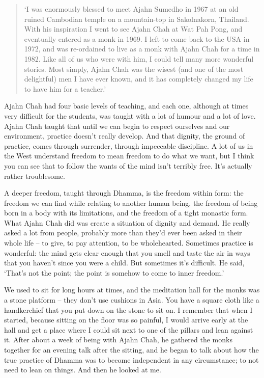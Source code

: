 
\begin{quote}
`I was enormously blessed to meet Ajahn Sumedho in 1967 at
an old ruined Cambodian temple on a mountain-top in Sakolnakorn, 
Thailand. With his inspiration I went to see Ajahn Chah at Wat Pah Pong, 
and eventually entered as a monk in 1969. I left to come back to the USA
in 1972, and was re-ordained to live as a monk with Ajahn Chah for a
time in 1982. Like all of us who were with him, I could tell many more
wonderful stories. Most simply, Ajahn Chah was the wisest (and one of
the most delightful) men I have ever known, and it has completely
changed my life to have him for a teacher.'
\end{quote}

\noindent
Ajahn Chah had four basic levels of teaching, and each one, although at
times very difficult for the students, was taught with a lot of humour
and a lot of love. Ajahn Chah taught that until we can begin to respect
ourselves and our environment, practice doesn't really develop. And that
dignity, the ground of practice, comes through surrender, through
impeccable discipline. A lot of us in the West understand freedom to
mean freedom to do what we want, but I think you can see that to follow
the wants of the mind isn't terribly free. It's actually rather
troublesome. 

A deeper freedom, taught through Dhamma, is the freedom within form: the
freedom we can find while relating to another human being, the freedom
of being born in a body with its limitations, and the freedom of a tight
monastic form. What Ajahn Chah did was create a situation of dignity and
demand. He really asked a lot from people, probably more than they'd
ever been asked in their whole life -- to give, to pay attention, to be
wholehearted. Sometimes practice is wonderful: the mind gets clear
enough that you smell and taste the air in ways that you haven't since
you were a child. But sometimes it's difficult. He said, `That's not the
point; the point is somehow to come to inner freedom.'

We used to sit for long hours at times, and the meditation hall for the
monks was a stone platform -- they don't use cushions in Asia. You have a
square cloth like a handkerchief that you put down on the stone to sit
on. I remember that when I started, because sitting on the floor was so
painful, I would arrive early at the hall and get a place where I could
sit next to one of the pillars and lean against it. After about a week
of being with Ajahn Chah, he gathered the monks together for an evening
talk after the sitting, and he began to talk about how the true practice
of Dhamma was to become independent in any circumstance; to not need to
lean on things. And then he looked at me. 

